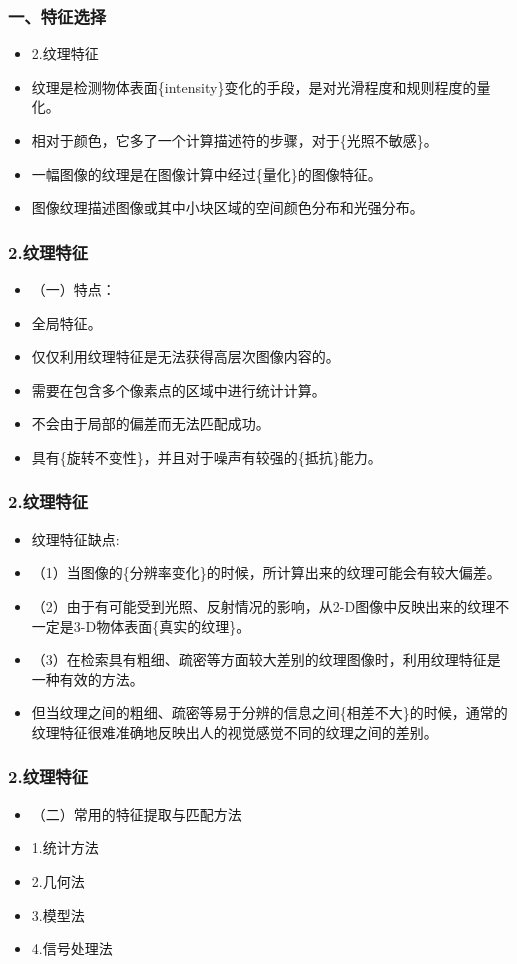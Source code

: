 \documentclass[notheorems,mathserif,table,compress]{beamer}  %
\begin{document}
\begin{frame}
  \frametitle{一、特征选择}
  \begin{itemize}
  \item 2.纹理特征
  \item 纹理是检测物体表面\{intensity\}变化的手段，是对光滑程度和规则程度的量化。
  \item 相对于颜色，它多了一个计算描述符的步骤，对于\{光照不敏感\}。
  \item 一幅图像的纹理是在图像计算中经过\{量化\}的图像特征。
  \item 图像纹理描述图像或其中小块区域的空间颜色分布和光强分布。
  \end{itemize}
\end{frame}

\begin{frame}
  \frametitle{2.纹理特征}
  \begin{itemize}
  \item （一）特点：
  \item 全局特征。
  \item 仅仅利用纹理特征是无法获得高层次图像内容的。
  \item 需要在包含多个像素点的区域中进行统计计算。
  \item 不会由于局部的偏差而无法匹配成功。
  \item 具有\{旋转不变性\}，并且对于噪声有较强的\{抵抗\}能力。
  \end{itemize}
\end{frame}

\begin{frame}
  \frametitle{2.纹理特征}
  \begin{itemize}
  \item 纹理特征缺点:
  \item （1）当图像的\{分辨率变化\}的时候，所计算出来的纹理可能会有较大偏差。
  \item （2）由于有可能受到光照、反射情况的影响，从2-D图像中反映出来的纹理不一定是3-D物体表面\{真实的纹理\}。
  \item （3）在检索具有粗细、疏密等方面较大差别的纹理图像时，利用纹理特征是一种有效的方法。
  \item  但当纹理之间的粗细、疏密等易于分辨的信息之间\{相差不大\}的时候，通常的纹理特征很难准确地反映出人的视觉感觉不同的纹理之间的差别。
  \end{itemize}
\end{frame}

\begin{frame}
  \frametitle{2.纹理特征}
  \begin{itemize}
  \item （二）常用的特征提取与匹配方法
  \item 1.统计方法
  \item 2.几何法
  \item 3.模型法
  \item 4.信号处理法
  \end{itemize}
\end{frame}
\end{document}
